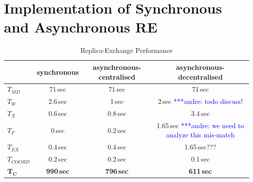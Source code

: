 \documentclass{rspublic}
\newcommand{\jhanote}[1]{ {\textcolor{red} { ***shantenu: #1 }}}
\newcommand{\alnote}[1]{ {\textcolor{blue} { ***andre: #1 }}}
\newcommand{\athotanote}[1]{ {\textcolor{green} { ***athota: #1 }}}
\newcommand{\alnote}[1]{}
\newcommand{\athotanote}[1]{}
\newcommand{\jhanote}[1]{}
\begin{document}
  

\section{Implementation of Synchronous and Asynchronous RE}
\label{sec:re_impl}





\begin{table}
    \centering
	\begin{tabular}{|l|c|c|c|}
	\hline
	                        &synchronous  &asynchronous-centralised &asynchronous-decentralised\\
	\hline
	$T_{MD}$       &71\,sec &71\,sec &71\,sec\\
	\hline
	\hline
	$T_{W}$        &2.6\,sec &1\,sec &2\,sec\alnote{todo discuss!}\\
	\hline
	\hline
	$T_{X}$        &0.6\,sec &0.8\,sec &3.4\,sec\\
	\hline
	\hspace{2mm}$T_{F}$        &0\,sec   &0.2\,sec &1.65\,sec \alnote{we need to analyze this mis-match}\\
	\hline
	\hspace{2mm}$T_{EX}$       &0.4\,sec &0.4\,sec &1.65\,sec???\\
	\hline
    \hspace{2mm}$T_{COORD}$    &0.2\,sec &0.2\,sec    &0.1\,sec\\
	\hline
	\hline
	$\mathbf{T_{C}}$        &\textbf{990\,sec} &\textbf{796\,sec}    &\textbf{611\,sec}\\
	\hline
    \end{tabular}
	\caption{Replica-Exchange Performance}
	\label{table:repex_perf}
\end{table}
\end{document}
